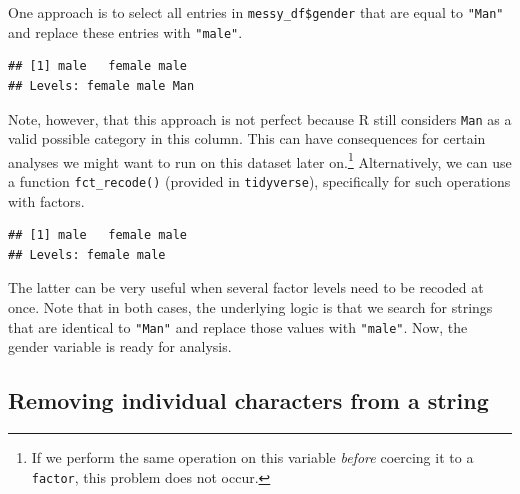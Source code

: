 \documentclass[
  12pt,
]{style/krantz}
\newenvironment{Shaded}{\begin{snugshade}}{\end{snugshade}}
\newcommand{\FunctionTok}[1]{\textcolor[rgb]{0.00,0.00,0.00}{#1}}
\newcommand{\NormalTok}[1]{#1}
\newcommand{\OtherTok}[1]{\textcolor[rgb]{0.56,0.35,0.01}{#1}}
\newcommand{\SpecialCharTok}[1]{\textcolor[rgb]{0.00,0.00,0.00}{#1}}
\newcommand{\StringTok}[1]{\textcolor[rgb]{0.31,0.60,0.02}{#1}}
\begin{document}
One approach is to select all entries in \texttt{messy\_df\$gender} that are equal to \texttt{"Man"} and replace these entries with \texttt{"male"}.

\begin{Shaded}
\end{Shaded}

\begin{verbatim}
## [1] male   female male  
## Levels: female male Man
\end{verbatim}

Note, however, that this approach is not perfect because R still considers \texttt{Man} as a valid possible category in this column. This can have consequences for certain analyses we might want to run on this dataset later on.\footnote{If we perform the same operation on this variable \emph{before} coercing it to a \texttt{factor}, this problem does not occur.} Alternatively, we can use a function \texttt{fct\_recode()} (provided in \texttt{tidyverse}), specifically for such operations with factors.

\begin{Shaded}
\end{Shaded}

\begin{verbatim}
## [1] male   female male  
## Levels: female male
\end{verbatim}

The latter can be very useful when several factor levels need to be recoded at once. Note that in both cases, the underlying logic is that we search for strings that are identical to \texttt{"Man"} and replace those values with \texttt{"male"}. Now, the gender variable is ready for analysis.

\hypertarget{removing-individual-characters-from-a-string}{%
\subsection{Removing individual characters from a string}\label{removing-individual-characters-from-a-string}}
\end{document}
